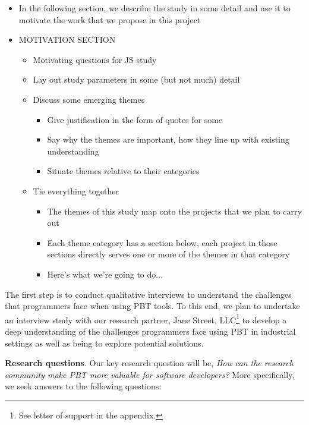 {\begin{itemize}
\begin{enumerate}
    \end{enumerate}
    \item In the following section, we describe the study in some detail and use
    it to motivate the work that we propose in this project
    \item MOTIVATION SECTION
    \begin{itemize}
      \item Motivating questions for JS study
      \item Lay out study parameters in some (but not much) detail
      \item Discuss some emerging themes
      \begin{itemize}
        \item Give justification in the form of quotes for some
        \item Say why the themes are important, how they line up with existing
        understanding
        \item Situate themes relative to their categories
      \end{itemize}
      \item Tie everything together
      \begin{itemize}
        \item The themes of this study map onto the projects that we plan to
        carry out
        \item Each theme category has a section below, each project in those
        sections directly serves one or more of the themes in that category
        \item Here's what we're going to do...
      \end{itemize}
    \end{itemize}
  \end{itemize}
}

\label{sec:motivation}
The first step is to conduct qualitative interviews to understand the challenges
that programmers face when using PBT tools. To this end, we plan to undertake an
interview study with our research partner, Jane Street, LLC\footnote{See letter
of support in the appendix.} to develop a deep understanding of the challenges
programmers face using PBT in industrial settings as well as being to explore
potential solutions.

\textbf{Research questions}.
Our key research question will be, \emph{How can the research community make PBT
more valuable for software developers?} More specifically, we seek
answers to the following questions:

